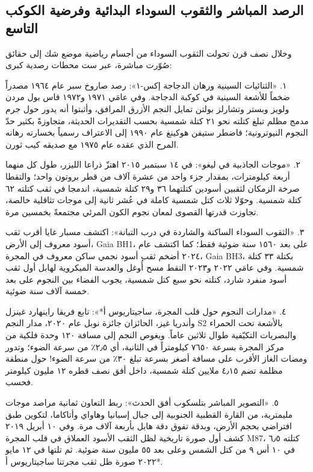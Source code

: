 \documentclass[12pt,a4paper,openany]{book}
\begin{document}
\subsection*{الرصد المباشر والثقوب السوداء البدائية وفرضية الكوكب التاسع}

وخلال نصف قرن تحولت الثقوب السوداء من أجسام رياضية موضع شك إلى حقائق صُوّرت مباشرة، عبر ست محطات رصدية كبرى:


١. «الثنائيات السينية ورهان الدجاجة إكس-١»: رصد صاروخ سبر عام ١٩٦٤ مصدراً ضخماً للأشعة السينية في كوكبة الدجاجة. وفي عامَي ١٩٧١ و١٩٧٢ قاس بول مردن ولويز وبستر وتشارلز بولتن تمايل النجم الأزرق المرافق، وأثبتوا أنه يدور حول جرم مدمج مظلم تبلغ كتلته نحو ٢١ كتلة شمسية بحسب التقديرات الحديثة، متجاوزةً بكثير حدّ النجوم النيوترونية؛ فاضطر ستيفن هوكينغ عام ١٩٩٠ إلى الاعتراف رسمياً بخسارته رهانه المرح الذي عقده عام ١٩٧٥ مع صديقه كيب ثورن.


٢. «موجات الجاذبية في ليغو»: في ١٤ سبتمبر ٢٠١٥ اهتزّ ذراعا الليزر، طول كل منهما أربعة كيلومترات، بمقدار جزء واحد من عشرة آلاف من قطر بروتون واحد؛ والتقطا صرخة الزمكان لثقبين أسودين كتلتهما ٣٦ و٢٩ كتلة شمسية، اندمجا في ثقب كتلته ٦٢ كتلة شمسية. وحوّلا ثلاث كتل شمسية كاملة في عُشر ثانية إلى موجات تثاقلية خالصة، تجاوزت قدرتها القصوى لمعان نجوم الكون المرئي مجتمعةً بخمسين مرة.


٣. «الثقوب السوداء الساكنة والشاردة في درب التبانة»: اكتشف مسبار غايا أقرب ثقب أسود معروف إلى الأرض، Gaia BH1، على بعد ١٥٦٠ سنة ضوئية فقط؛ كما اكتشف عام ٢٠٢٤ أضخم ثقب أسود نجمي ساكن معروف في المجرة، Gaia BH3، بكتلة ٣٣ كتلة شمسية. وفي عامَي ٢٠٢٢ و٢٠٢٣ التقط مسح أُوغل والعدسة الميكروية لهابل أول ثقب أسود منفرد شارد، كتلته نحو سبع كتل شمسية، يجوب الفضاء بين النجوم على بعد خمسة آلاف سنة ضوئية.


٤. «مدارات النجوم حول قلب المجرة، ساجيتاريوس أ*»: تابع فريقا راينهارد غينزل وأندريا غيز، الحائزان جائزة نوبل عام ٢٠٢٠، مدار النجم S2 بالأشعة تحت الحمراء والبصريات التكيّفية طوال ثلاثين عاماً. ويغوص النجم إلى مسافة ١٢٠ وحدة فلكية من مركز المجرة بسرعة ٧٦٥٠ كيلومتراً في الثانية، أي ٢٫٥٪ من سرعة الضوء؛ وتدور ومضات الغاز الأقرب على مسافة أصغر بسرعة تبلغ ٣٠٪ من سرعة الضوء! حول منطقة مظلمة تضم ٤٫١٥ ملايين كتلة شمسية، داخل أفق نصف قطره ١٢ مليون كيلومتر فحسب.


٥. «التصوير المباشر بتلسكوب أفق الحدث»: ربط التعاون ثمانية مراصد موجات مليمترية، من القارة القطبية الجنوبية إلى جبال إسبانيا وهاواي وأتاكاما، لتكوين طبق افتراضي بحجم الأرض، وبدقة تفوق دقة هابل بأربعة آلاف مرة. وفي ١٠ أبريل ٢٠١٩ كشف أول صورة تاريخية لظل الثقب الأسود العملاق في قلب المجرة M87، كتلته ٦٫٥ في ١٠ أس ٩ من كتل الشمس وعلى بعد ٥٥ مليون سنة ضوئية. ثم تلتها في ١٢ مايو ٢٠٢٢ صورة ظل ثقب مجرتنا ساجيتاريوس أ*.
\end{document}
